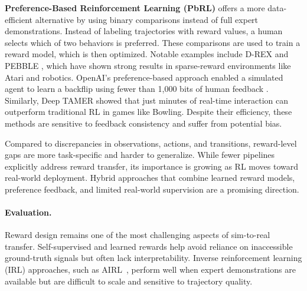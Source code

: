 \textbf{Preference-Based Reinforcement Learning (PbRL)} offers a more data-efficient alternative by using binary comparisons instead of full expert demonstrations. Instead of labeling trajectories with reward values, a human selects which of two behaviors is preferred. These comparisons are used to train a reward model, which is then optimized. Notable examples include D-REX \cite{Brown2019} and PEBBLE \cite{Lee2021}, which have shown strong results in sparse-reward environments like Atari and robotics. OpenAI’s preference-based approach enabled a simulated agent to learn a backflip using fewer than 1{,}000 bits of human feedback \cite{Christiano2017}. Similarly, Deep TAMER \cite{Warnell2017} showed that just minutes of real-time interaction can outperform traditional RL in games like Bowling. Despite their efficiency, these methods are sensitive to feedback consistency and suffer from potential bias.

Compared to discrepancies in observations, actions, and transitions, reward-level gaps are more task-specific and harder to generalize. While fewer \simtoreal pipelines explicitly address reward transfer, its importance is growing as RL moves toward real-world deployment. Hybrid approaches that combine learned reward models, preference feedback, and limited real-world supervision are a promising direction.

\paragraph{Evaluation.} Reward design remains one of the most challenging aspects of sim-to-real transfer. Self-supervised and learned rewards help avoid reliance on inaccessible ground-truth signals but often lack interpretability. Inverse reinforcement learning (IRL) approaches, such as AIRL~\cite{Fu2018}, perform well when expert demonstrations are available but are difficult to scale and sensitive to trajectory quality.